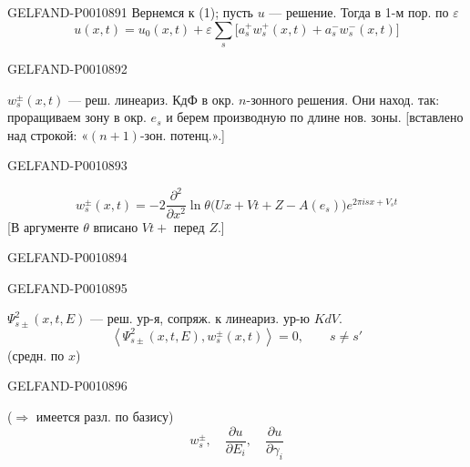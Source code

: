 \begin{GelfandAdjacentEvidence}{GELFAND-P001089}{1}
Вернемся к (1); пусть $u$ — решение. Тогда в 1-м пор. по $\varepsilon$
\begin{equation*}
u(x,t)=u_0(x,t)+\varepsilon\sum_s
\bigl[a_s^+w_s^+(x,t)+a_s^-w_s^-(x,t)\bigr]
\tag{11}
\end{equation*}
\end{GelfandAdjacentEvidence}
\begin{GelfandAdjacentEvidence}{GELFAND-P001089}{2}


$w_s^\pm(x,t)$ — реш. линеариз. КдФ в окр. $n$-зонного решения.
Они наход. так: проращиваем зону в окр. $e_s$ и берем производную по длине нов. зоны.
[вставлено над строкой: «$(n+1)$-зон. потенц.».]
\end{GelfandAdjacentEvidence}
\begin{GelfandAdjacentEvidence}{GELFAND-P001089}{3}

\begin{equation*}
w_s^\pm(x,t)=-2\frac{\partial^2}{\partial x^2}
\ln\theta\bigl(Ux+Vt+Z-A(e_s)\bigr)e^{2\pi isx+V_st}
\tag{12}
\end{equation*}
[В аргументе $\theta$ вписано $Vt+$ перед $Z$.]
\end{GelfandAdjacentEvidence}
\begin{GelfandAdjacentEvidence}{GELFAND-P001089}{4}

\end{GelfandAdjacentEvidence}
\begin{GelfandAdjacentEvidence}{GELFAND-P001089}{5}


$\Psi^2_{s\pm}(x,t,E)$ — реш. ур-я, сопряж. к линеариз. ур-ю $KdV$.
\begin{equation*}
\left\langle\Psi^2_{s\pm}(x,t,E),w_s^\pm(x,t)\right\rangle=0,
\qquad s\ne s'
\tag{13}
\end{equation*}
(средн. по $x$)
\end{GelfandAdjacentEvidence}
\begin{GelfandAdjacentEvidence}{GELFAND-P001089}{6}


($\Rightarrow$ имеется разл. по базису)
\[
w_s^\pm,\quad \frac{\partial u}{\partial E_i},\quad
\frac{\partial u}{\partial\gamma_i}
\]
\end{GelfandAdjacentEvidence}
